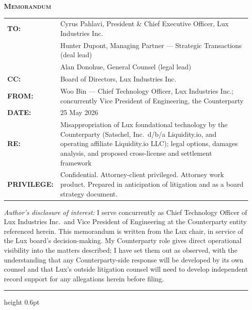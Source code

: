 \documentclass[11pt,letterpaper]{article}
\begin{document}
\begin{flushleft}
\textbf{\textsc{Memorandum}}\\[0.5em]
\begin{tabularx}{\textwidth}{lX}
\textbf{TO:}        & Cyrus Pahlavi, President \& Chief Executive Officer, Lux Industries Inc. \\
                    & Hunter Dupont, Managing Partner --- Strategic Transactions (deal lead) \\
                    & Alan Donohue, General Counsel (legal lead) \\
\textbf{CC:}        & Board of Directors, Lux Industries Inc. \\
\textbf{FROM:}      & Woo Bin --- Chief Technology Officer, Lux Industries Inc.; concurrently Vice President of Engineering, the Counterparty \\
\textbf{DATE:}      & 25 May 2026 \\
\textbf{RE:}        & Misappropriation of Lux foundational technology by the Counterparty (Satschel, Inc.\ d/b/a Liquidity.io, and operating affiliate Liquidity.io LLC); legal options, damages analysis, and proposed cross-license and settlement framework \\
\textbf{PRIVILEGE:} & Confidential. Attorney-client privileged. Attorney work product. Prepared in anticipation of litigation and as a board strategy document. \\
\end{tabularx}
\end{flushleft}

\vspace{0.3em}
\begin{small}
\textit{Author's disclosure of interest:} I serve concurrently as
Chief Technology Officer of Lux Industries Inc.\ and Vice President
of Engineering at the Counterparty entity referenced herein. This
memorandum is written from the Lux chair, in service of the Lux
board's decision-making. My Counterparty role gives direct
operational visibility into the matters described; I have set them
out as observed, with the understanding that any Counterparty-side
response will be developed by its own counsel and that Lux's outside
litigation counsel will need to develop independent record support
for any allegations herein before filing.
\end{small}

\vspace{0.5em}\hrule height 0.6pt\vspace{1em}
\end{document}
